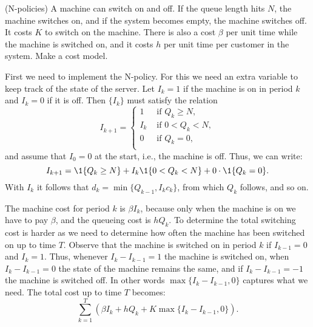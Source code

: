 \begin{exercise}(N-policies) A machine can switch on and off. If the
  queue length hits $N$, the machine switches on, and if the system
  becomes empty, the machine switches off. It costs $K$ to switch on
  the machine. There is also a cost $\beta$ per unit time while the
  machine is switched on, and it costs $h$ per unit time per customer
  in the system. Make a cost model. 
  \begin{solution}
    First we need to implement the N-policy. For this we need an extra
    variable to keep track of the state of the server. Let $I_k=1$ if the machine is on in period $k$ and $I_k=0$ if it is off. Then $\{I_k\}$ must satisfy the relation
    \begin{equation*}
      I_{k+1} =
      \begin{cases}
        1 & \text{ if } Q_{k} \geq N,\\
        I_k & \text{ if } 0< Q_{k} <N,\\
        0 & \text{ if }  Q_{k} =0,\\
      \end{cases}
    \end{equation*}
and assume that $I_0 =0$ at the start, i.e., the machine is off. Thus, we can write:
\begin{equation*}
  I_{k+1} = \1{Q_k\geq N} + I_k \1{0<Q_k<N} + 0\cdot \1{Q_k = 0}.
\end{equation*}
With $I_k$ it follows that $d_k =\min\{Q_{k-1}, I_k c_k\}$, from which
$Q_k$ follows, and so on.

The machine cost for period $k$ is $\beta I_k$, because only when the
machine is on we have to pay $\beta$, and the queueing cost is
$h Q_k$. To determine the total switching cost is harder as we need to
determine how often the machine has been switched on up to time
$T$. Observe that the machine is switched on in period $k$ if
$I_{k-1} = 0$ and $I_k=1$. Thus, whenever $I_k - I_{k-1}=1$ the
machine is switched on, when $I_k - I_{k-1}=0$ the state of the
machine remains the same, and if $I_k - I_{k-1} = -1$ the machine is
switched off. In other words $\max\{I_k - I_{k-1},0\}$ captures what
we need. The total cost up to time $T$ becomes:
\begin{equation*}
  \sum_{k=1}^T \left(\beta I_k + h Q_k + K\max\{I_k - I_{k-1}, 0\}\right).
\end{equation*}
  \end{solution}
\end{exercise}




